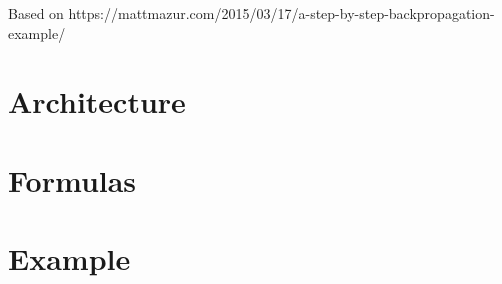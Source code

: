 \documentclass{article}
\begin{document}
    \title{}
    \author{}
    \date{}

    Based on https://mattmazur.com/2015/03/17/a-step-by-step-backpropagation-example/

    \section{Architecture}

    

    \section{Formulas}
    
    

    \section{Example}

    
\end{document}
